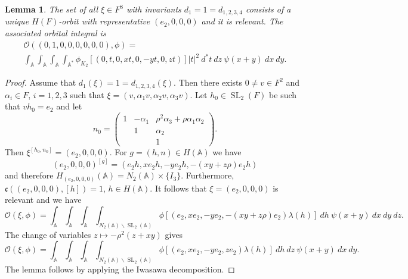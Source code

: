 \documentclass[12pt]{amsart}
\newcommand{\abs}[1]{\left|{#1}\right|}
\newcommand{\SL}{\operatorname{SL}}
\newcommand{\A}{\mathbb{A}}
\newcommand{\bs}{\backslash}
\renewcommand{\O}{\mathcal{O}}
\renewcommand{\c}{\mathfrak{c}}
\newtheorem{lemma}[theorem]{Lemma}
\theoremstyle{remark}
\begin{document}
\begin{lemma}\label{relevant-47}
The set of all $\xi\in F^8$ with invariants $d_1=1=d_{1,2,3,4}$ consists of a unique $H(F)$-orbit with representative $(e_2,0,0,0)$ and it is relevant. The associated orbital integral is
\begin{multline*}
\O((0,1,0,0,0,0,0,0),\phi)=\\
\int_\A \int_\A\int_\A \int_{\A^*} \phi_{K_2}[(0,t,0,xt,0,-yt,0,zt)]\abs{t}^2\ d^*t \ dz\ \psi(x+y)\ dx\ dy.
\end{multline*}
\end{lemma}
\begin{proof}
Assume that $d_1(\xi)=1=d_{1,2,3,4}(\xi)$. Then there exists $0\ne v\in F^2$ and $\alpha_i\in F$, $i=1,2,3$ such that $\xi=(v,\alpha_1 v,\alpha_2 v,\alpha_3 v)$. 
Let $h_0\in \SL_2(F)$ be such that $vh_0=e_2$ and let
\[
n_0=\begin{pmatrix}
1 & -\alpha_1 & \rho^2\alpha_3+\rho\alpha_1\alpha_2\\  & 1 & \alpha_2 \\ & & 1
\end{pmatrix}.
\]
Then $\xi^{[h_0,n_0]}=(e_2,0,0,0)$.
For $g=(h,n)\in H(\A)$ we have
\[
(e_2,0,0,0)^{[g]}=(e_2 h,xe_2h,-ye_2h,-(xy+z\rho)e_2h)
\]
and therefore $H_{(e_2,0,0,0)}(\A)=N_2(\A)\times \{I_3\}$. Furthermore, $\c((e_2,0,0,0),[h])=1$, $h\in H(\A)$. It follows that $\xi=(e_2,0,0,0)$ is relevant and we have
\[
\O(\xi,\phi)=\int_\A \int_\A\int_\A\int_{N_2(\A)\bs \SL_2(\A)} \phi[(e_2,xe_2,-ye_2,-(xy+z\rho)e_2)\lambda(h)]\ dh\ \psi(x+y) \ dx\ dy\ dz.
\] 
The change of variables $z\mapsto -\rho^2(z+xy)$ gives
\[
\O(\xi,\phi)=\int_\A \int_\A\int_\A\int_{N_2(\A)\bs \SL_2(\A)} \phi[(e_2,xe_2,-ye_2,ze_2)\lambda(h)]\ dh\ dz\ \psi(x+y) \ dx\ dy.
\] 
The lemma follows by applying the Iwasawa decomposition. 
\end{proof}
\end{document}
